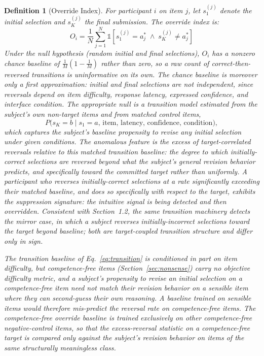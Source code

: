 \documentclass[11pt,letterpaper]{article}
\newtheorem{definition}{Definition}
\begin{document}
\begin{definition}[Override Index]
For participant $i$ on item $j$, let $s_1^{(j)}$ denote the initial selection and $s_K^{(j)}$ the final submission. The override index is:
\begin{equation}
O_i = \frac{1}{N} \sum_{j=1}^{N} \mathbb{1}[s_1^{(j)} = a_j^* \;\wedge\; s_K^{(j)} \neq a_j^*]
\label{eq:override}
\end{equation}
Under the null hypothesis (random initial and final selections), $O_i$ has a nonzero chance baseline of $\frac{1}{M}\left(1 - \frac{1}{M}\right)$ rather than zero, so a raw count of correct-then-reversed transitions is uninformative on its own. The chance baseline is moreover only a first approximation: initial and final selections are not independent, since reversals depend on item difficulty, response latency, expressed confidence, and interface condition. The appropriate null is a \textit{transition model} estimated from the subject's own non-target items and from matched control items,
\begin{equation}
P\big(s_K = b \mid s_1 = a,\, \text{item},\, \text{latency},\, \text{confidence},\, \text{condition}\big),
\label{eq:transition}
\end{equation}
which captures the subject's baseline propensity to revise any initial selection under given conditions. The anomalous feature is the \textit{excess} of target-correlated reversals relative to this matched transition baseline: the degree to which initially-correct selections are reversed \textit{beyond} what the subject's general revision behavior predicts, and specifically toward the committed target rather than uniformly. A participant who reverses initially-correct selections at a rate significantly exceeding their matched baseline, and does so specifically with respect to the target, exhibits the suppression signature: the intuitive signal is being detected and then overridden. Consistent with Section~1.2, the same transition machinery detects the mirror case, in which a subject reverses initially-incorrect selections \textit{toward} the target beyond baseline; both are target-coupled transition structure and differ only in sign.

The transition baseline of Eq.~\ref{eq:transition} is conditioned in part on item difficulty, but competence-free items (Section~\ref{sec:nonsense}) carry no objective difficulty metric, and a subject's propensity to revise an initial selection on a competence-free item need not match their revision behavior on a sensible item where they can second-guess their own reasoning. A baseline trained on sensible items would therefore mis-predict the reversal rate on competence-free items. The competence-free override baseline is trained exclusively on other competence-free negative-control items, so that the excess-reversal statistic on a competence-free target is compared only against the subject's revision behavior on items of the same structurally meaningless class.


\end{definition}
\end{document}
